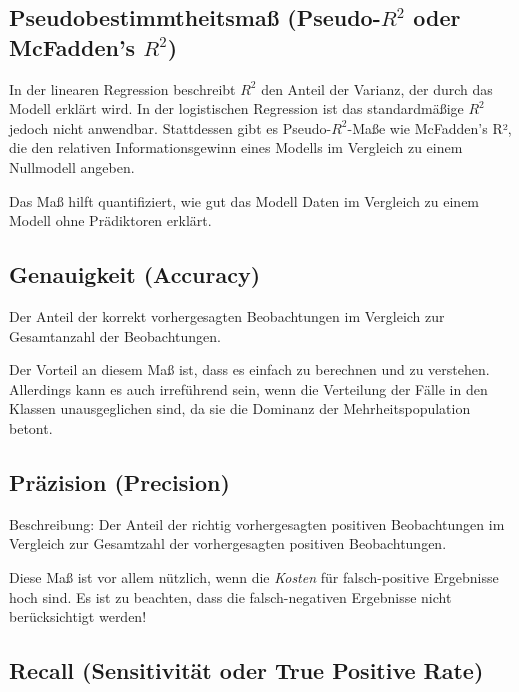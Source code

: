 \documentclass[
]{article}
\begin{document}
\subsection{\texorpdfstring{Pseudobestimmtheitsmaß (Pseudo-\(R^2\) oder McFadden's \(R^2\))}{Pseudobestimmtheitsmaß (Pseudo-R\^{}2 oder McFadden's R\^{}2)}}\label{pseudobestimmtheitsmauxdf-pseudo-r2-oder-mcfaddens-r2}

In der linearen Regression beschreibt \(R^2\) den Anteil der Varianz, der durch das Modell erklärt wird. In der logistischen Regression ist das standardmäßige \(R^2\) jedoch nicht anwendbar. Stattdessen gibt es Pseudo-\(R^2\)-Maße wie McFadden's R², die den relativen Informationsgewinn eines Modells im Vergleich zu einem Nullmodell angeben.

Das Maß hilft quantifiziert, wie gut das Modell Daten im Vergleich zu einem Modell ohne Prädiktoren erklärt.

\subsection{Genauigkeit (Accuracy)}\label{genauigkeit-accuracy}

Der Anteil der korrekt vorhergesagten Beobachtungen im Vergleich zur Gesamtanzahl der Beobachtungen.

Der Vorteil an diesem Maß ist, dass es einfach zu berechnen und zu verstehen. Allerdings kann es auch irreführend sein, wenn die Verteilung der Fälle in den Klassen unausgeglichen sind, da sie die Dominanz der Mehrheitspopulation betont.

\subsection{Präzision (Precision)}\label{pruxe4zision-precision}

Beschreibung: Der Anteil der richtig vorhergesagten positiven Beobachtungen im Vergleich zur Gesamtzahl der vorhergesagten positiven Beobachtungen.

Diese Maß ist vor allem nützlich, wenn die \emph{Kosten} für falsch-positive Ergebnisse hoch sind. Es ist zu beachten, dass die falsch-negativen Ergebnisse nicht berücksichtigt werden!

\subsection{Recall (Sensitivität oder True Positive Rate)}\label{recall-sensitivituxe4t-oder-true-positive-rate}
\end{document}
